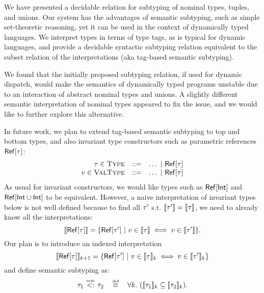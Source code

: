 We have presented a decidable relation for subtyping of
nominal types, tuples, and unions.
Our system has the advantages of semantic subtyping, 
such as simple set-theoretic reasoning, 
yet it can be used in the context of dynamically typed languages.
We interpret types in terms of type tags, 
as is typical for dynamic languages,
and provide a decidable syntactic subtyping relation %
equivalent to the subset relation of the interpretations
(aka tag-based semantic subtyping).

We found that the initially proposed subtyping relation, 
if used for dynamic dispatch, 
would make the semantics of dynamically typed programs unstable
due to an interaction of abstract nominal types and unions.
A slightly different semantic interpretation of nominal types 
appeared to fix the issue, 
and we would like to further explore this alternative.

In future work, we plan to extend tag-based semantic subtyping 
to top and bottom types, 
and also invariant type constructors such as 
parametric references $\mathsf{Ref}[\tau]$: %
\[
\begin{array}{rcl}
\tau \in \textsc{Type}   &::=& \ldots ~\vert~ \mathsf{Ref}[\tau]\\
v \in \textsc{ValType} &::=& \ldots ~\vert~ \mathsf{Ref}[\tau]
\end{array}
\]
As usual for invariant constructors, 
we would like types such as $\mathsf{Ref}[\mathsf{Int}]$
and $\mathsf{Ref}[\mathsf{Int} \cup \mathsf{Int}]$ to be equivalent.
However, a naive interpretation of invariant types below
is not well defined because to find all $\tau'$ 
s.t. $\llbracket \tau' \rrbracket = \llbracket \tau \rrbracket$, 
we need to already know all the interpretations:
\[
\llbracket \mathsf{Ref}[\tau] \rrbracket = 
\{ \mathsf{Ref}[\tau'] ~\vert~ v \in \llbracket \tau \rrbracket \iff v \in \llbracket \tau' \rrbracket \}.
\]
Our plan is to introduce an indexed interpretation
\[
\llbracket \mathsf{Ref}[\tau] \rrbracket_{k+1} = \{ \mathsf{Ref}[\tau'] 
    ~\vert~ v \in \llbracket \tau \rrbracket_k \iff v \in \llbracket \tau' \rrbracket_k \}
\]
and define semantic subtyping as:
\[
\bjtruesemsub{\ty_1}{\ty_2} \quad \defsign \quad
\forall k.\ (\interpty{\ty_1}_k \subseteq \interpty{\ty_2}_k).
\]
